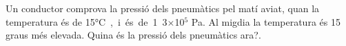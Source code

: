 \begin{exr}
    Un conductor comprova la pressió dels pneumàtics pel matí aviat, quan la temperatura és de 15\si\degreeCelsius, i és de 1.3$\times$10$^5$ Pa. Al migdia la temperatura és 15 graus més elevada. Quina és la pressió dels pneumàtics ara?.
    \end{exr}
